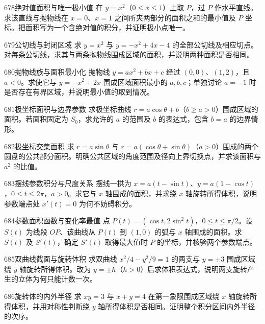 \begin{exercise}{678}{绝对值面积与唯一极小值}
在 $y=x^2$（$0\le x\le1$）上取 $P$，过 $P$ 作水平直线。求该直线与抛物线在 $x=0$、$x=1$ 之间所夹两部分的面积之和的最小值及 $P$ 坐标。把面积写为一个含绝对值的积分，并证明极小点唯一。
\end{exercise}
\begin{exercise}{679}{公切线与封闭区域}
求 $y=x^2$ 与 $y=-x^2+4x-4$ 的全部公切线及相应切点。对每条公切线，求其与两条抛物线围成区域的面积，并说明两种面积是否相同。
\end{exercise}
\begin{exercise}{680}{抛物线族与面积最小化}
抛物线 $y=ax^2+bx+c$ 经过 $(0,0)$、$(1,2)$，且 $a<0$。求使它与 $y=-x^2+2x$ 围成区域面积最小的 $a,b,c$；单独讨论 $a=-1$ 时是否存在有界区域，并说明最小值的取到情况。
\end{exercise}
\begin{exercise}{681}{极坐标面积与边界参数}
求极坐标曲线 $r=a\cos\theta+b$（$b\ge a>0$）围成区域的面积。若面积固定为 $S_0$，求允许的 $a$ 的范围及 $b$ 的表达式，包含 $b=a$ 的边界情形。
\end{exercise}
\begin{exercise}{682}{极坐标交集面积}
求 $r=a\sin\theta$ 与 $r=a(\cos\theta+\sin\theta)$（$a>0$）围成的两个圆盘的公共部分面积。明确公共区域的角度范围及径向上界切换点，并求该面积与 $a^2$ 的比值。
\end{exercise}
\begin{exercise}{683}{摆线参数积分与尺度关系}
摆线一拱为 $x=a(t-\sin t)$、$y=a(1-\cos t)$，$0\le t\le2\pi$，$a>0$。求它与 $x$ 轴围成的面积，并求绕 $x$ 轴旋转所得体积，说明参数端点处 $x'(t)=0$ 为何不妨碍积分。
\end{exercise}
\begin{exercise}{684}{参数面积函数与变化率最值}
点 $P(t)=(\cos t,2\sin^2t)$，$0\le t\le\pi/2$。设 $S(t)$ 为线段 $OP$、该曲线从 $P(t)$ 到 $(1,0)$ 的弧与 $x$ 轴围成的面积。求 $S(t)$ 及 $S'(t)$，确定 $S'(t)$ 取得最大值时 $P$ 的坐标，并核验两个参数端点。
\end{exercise}
\begin{exercise}{685}{双曲线截面与旋转体积}
求双曲线 $x^2/4-y^2/9=1$ 的两支与 $y=\pm3$ 围成区域绕 $y$ 轴旋转所得体积。改为 $y=\pm h$（$h>0$）后求体积表达式，说明两支旋转产生的立体为何只能计数一次。
\end{exercise}
\begin{exercise}{686}{旋转体的内外半径}
求 $xy=3$ 与 $x+y=4$ 在第一象限围成区域绕 $x$ 轴旋转所得体积，并用对称性判断绕 $y$ 轴所得体积是否相同。证明整个积分区间内外半径的次序。
\end{exercise}

